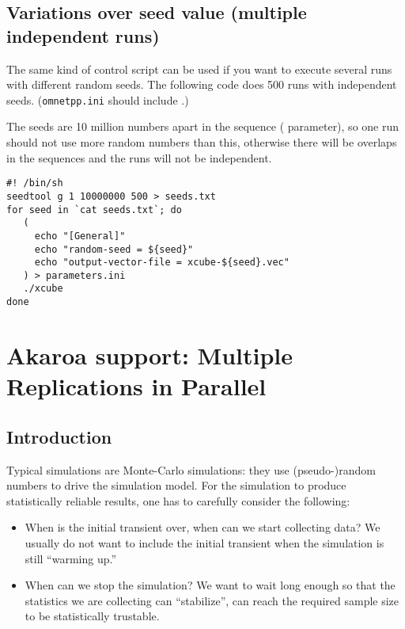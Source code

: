 \subsection{Variations over seed value (multiple independent runs)}

The same kind of control script can be used if you want to execute
several runs with different random seeds.
The following code does 500 runs with independent seeds.
(\texttt{omnetpp.ini} should include .)

The seeds are 10 million numbers apart in the sequence (
parameter), so one run should not use more random numbers than this,
otherwise there will be overlaps in the sequences and the runs
will not be independent.

\begin{verbatim}
#! /bin/sh
seedtool g 1 10000000 500 > seeds.txt
for seed in `cat seeds.txt`; do
   (
     echo "[General]"
     echo "random-seed = ${seed}"
     echo "output-vector-file = xcube-${seed}.vec"
   ) > parameters.ini
   ./xcube
done
\end{verbatim}





\section{Akaroa support: Multiple Replications in Parallel}
\label{sec:ch-run-sim:akaroa}

\subsection{Introduction}

Typical simulations are Monte-Carlo simulations: they use
(pseudo-)random numbers to drive the simulation model.
For the simulation to produce statistically reliable results,
one has to carefully consider the following:

\begin{itemize}
  \item{When is the initial transient over, when can we start
    collecting data? We usually do not want to include the
    initial transient when the simulation is still ``warming up.''}
  \item{When can we stop the simulation? We want to wait long enough
    so that the statistics we are collecting can ``stabilize'',
    can reach the required sample size to be statistically trustable.}
\end{itemize}

